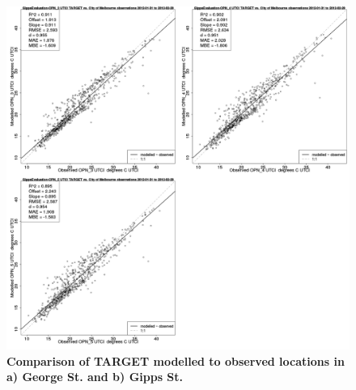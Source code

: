 \documentclass[final,3p,times,authoryear]{elsarticle}
\begin{document}
\begin{figure}[!htbp]
\includegraphics[scale=0.15]{images/Eval/GippsEvaluation-ErrorPlots-UTCI.png}

\caption{\bf Comparison of TARGET modelled  to observed locations in a) George St. and b) Gipps St.}    
 \label{fig:utcieval} 
\end{figure} 
\end{document}
